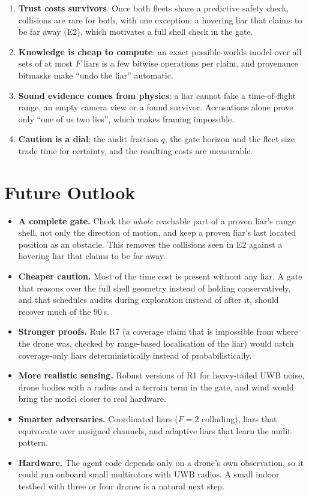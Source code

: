 \begin{keybox}[Takeaways]
\begin{enumerate}
    \item \textbf{Trust costs survivors}. Once both fleets share a predictive safety check, collisions are rare for
          both, with one exception: a hovering liar that claims to be far away (E2), which motivates a full shell check
          in the gate.
    \item \textbf{Knowledge is cheap to compute}: an exact possible-worlds model over all sets of at most $F$ liars is a
          few bitwise operations per claim, and provenance bitmasks make ``undo the liar'' automatic.
    \item \textbf{Sound evidence comes from physics}: a liar cannot fake a time-of-flight range, an empty camera view or
          a found survivor. Accusations alone prove only ``one of us two lies'', which makes framing impossible.
    \item \textbf{Caution is a dial}: the audit fraction $q$, the gate horizon and the fleet size trade time for
          certainty, and the resulting costs are measurable.
\end{enumerate}
\end{keybox}

\section{Future Outlook}

\begin{itemize}
    \item \textbf{A complete gate.} Check the \emph{whole} reachable part of a proven liar's range shell, not only
          the direction of motion, and keep a proven liar's last located position as an obstacle. This removes the
          collisions seen in E2 against a hovering liar that claims to be far away.
    \item \textbf{Cheaper caution.} Most of the time cost is present without any liar. A gate that reasons over the
          full shell geometry instead of holding conservatively, and that schedules audits during exploration instead
          of after it, should recover much of the 90\,s.
    \item \textbf{Stronger proofs.} Rule R7 (a coverage claim that is impossible from where the drone was, checked by
          range-based localisation of the liar) would catch coverage-only liars deterministically instead of
          probabilistically.
    \item \textbf{More realistic sensing.} Robust versions of R1 for heavy-tailed UWB noise, drone bodies with a radius
          and a terrain term in the gate, and wind would bring the model closer to real hardware.
    \item \textbf{Smarter adversaries.} Coordinated liars ($F=2$ colluding), liars that equivocate over unsigned
          channels, and adaptive liars that learn the audit pattern.
    \item \textbf{Hardware.} The agent code depends only on a drone's own observation, so it could run onboard
          small multirotors with UWB radios. A small indoor testbed with three or four drones is a natural next step.
\end{itemize}
